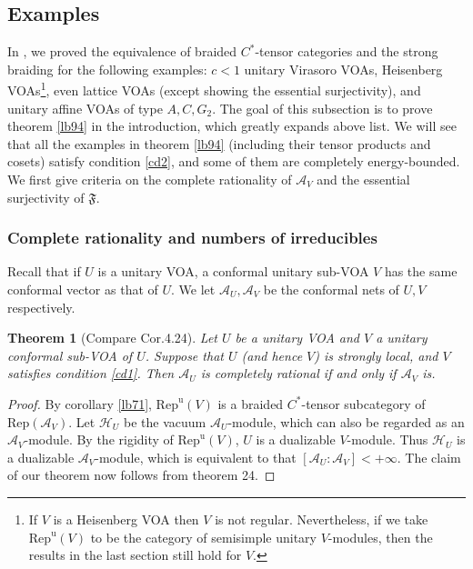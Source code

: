 \documentclass[12pt,a4paper]{article}
\theoremstyle{definition}
\theoremstyle{plain}
\newtheorem{thm}[df]{Theorem}
\newcommand{\fk}{\mathfrak}
\newcommand{\mc}{\mathcal}
\newcommand{\Rep}{\mathrm{Rep}}
\newcommand{\RepuV}{\mathrm{Rep}^{\mathrm u}(V)}
\numberwithin{equation}{subsection}
\begin{document}
\subsection{Examples}\label{lb74}

In \cite{Gui21a}, we  proved the equivalence of braided $C^*$-tensor categories and the strong braiding for the following examples:  $c<1$ unitary Virasoro VOAs, Heisenberg VOAs\footnote{If $V$ is a  Heisenberg VOA then $V$ is not regular. Nevertheless, if we take $\RepuV$ to be the category of semisimple unitary $V$-modules, then the results in the last section still hold for $V$.}, even lattice VOAs (except showing the essential surjectivity), and unitary affine VOAs of type $A,C,G_2$. The goal of this subsection is  to  prove theorem \ref{lb94} in the introduction, which greatly expands above list. We will see that all the examples in theorem \ref{lb94} (including their tensor products and cosets) satisfy condition \ref{cd2}, and some of them are  completely energy-bounded.  We first give criteria on the complete rationality of $\mc A_V$ and the essential surjectivity of $\fk F$.

\subsubsection*{Complete rationality and numbers of irreducibles}

Recall that if $U$ is a unitary VOA, a conformal unitary sub-VOA $V$ has the same conformal vector as that of $U$. We let $\mc A_U,\mc A_V$ be the conformal nets of $U,V$ respectively.

\begin{thm}[Compare \cite{Ten19c} Cor.4.24]\label{lb84}
	Let $U$ be a unitary VOA and $V$ a unitary conformal sub-VOA of $U$. Suppose that $U$ (and hence $V$) is strongly local, and   $V$ satisfies condition \ref{cd1}. Then $\mc A_U$ is completely rational if and only if $\mc A_V$ is.
\end{thm}

\begin{proof}
	By corollary \ref{lb71}, $\RepuV$ is a braided $C^*$-tensor subcategory of $\Rep(\mc A_V)$. Let $\mc H_U$ be the vacuum $\mc A_U$-module, which can also be regarded as an $\mc A_V$-module. By the rigidity of $\RepuV$, $U$ is a dualizable $V$-module. Thus $\mc H_U$ is a dualizable $\mc A_V$-module, which is equivalent to that $[\mc A_U:\mc A_V]<+\infty$. The claim of our theorem now follows from \cite{Lon03} theorem 24.
\end{proof}
\end{document}
